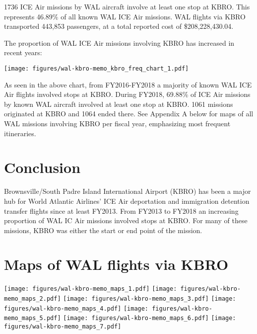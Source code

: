\documentclass[a4paper,11pt,final]{article}
\begin{document}
1736 ICE Air missions by WAL aircraft involve at least one stop at KBRO.
This represents 46.89\% of all known WAL ICE Air missions. WAL flights
via KBRO transported 443,853 passengers, at a total reported cost of
\$208,228,430.04.

The proportion of WAL ICE Air missions involving KBRO has increased in
recent years:

\texttt{[image: figures/wal-kbro-memo\_kbro\_freq\_chart\_1.pdf]}

As seen in the above chart, from FY2016-FY2018 a majority of known WAL
ICE Air flights involved stops at KBRO. During FY2018, 69.88\% of ICE
Air missions by known WAL aircraft involved at least one stop at KBRO.
1061 missions originated at KBRO and 1064 ended there. See Appendix A
below for maps of all WAL missions involving KBRO per fiscal year,
emphasizing most frequent itineraries.

\section{Conclusion}

Brownsville/South Padre Island International Airport (KBRO) has been a
major hub for World Atlantic Airlines' ICE Air deportation and
immigration detention transfer flights since at least FY2013. From
FY2013 to FY2018 an increasing proportion of WAL IC Air missions
involved stops at KBRO. For many of these missions, KBRO was either the
start or end point of the mission.

\appendix
\section{Maps of WAL flights via KBRO}







\texttt{[image: figures/wal-kbro-memo\_maps\_1.pdf]}
\texttt{[image: figures/wal-kbro-memo\_maps\_2.pdf]}
\texttt{[image: figures/wal-kbro-memo\_maps\_3.pdf]}
\texttt{[image: figures/wal-kbro-memo\_maps\_4.pdf]}
\texttt{[image: figures/wal-kbro-memo\_maps\_5.pdf]}
\texttt{[image: figures/wal-kbro-memo\_maps\_6.pdf]}
\texttt{[image: figures/wal-kbro-memo\_maps\_7.pdf]}
\end{document}
